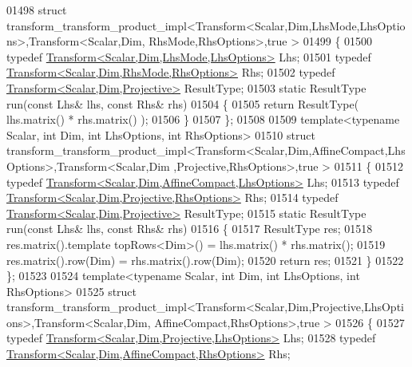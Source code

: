 \begin{DoxyCode}
01498 \textcolor{keyword}{struct }transform\_transform\_product\_impl<Transform<Scalar,Dim,LhsMode,LhsOptions>,Transform<Scalar,Dim,
      RhsMode,RhsOptions>,true >
01499 \{
01500   \textcolor{keyword}{typedef} \hyperlink{group___geometry___module_class_eigen_1_1_transform}{Transform<Scalar,Dim,LhsMode,LhsOptions>} Lhs;
01501   \textcolor{keyword}{typedef} \hyperlink{group___geometry___module_class_eigen_1_1_transform}{Transform<Scalar,Dim,RhsMode,RhsOptions>} Rhs;
01502   \textcolor{keyword}{typedef} \hyperlink{group___geometry___module_class_eigen_1_1_transform}{Transform<Scalar,Dim,Projective>} ResultType;
01503   \textcolor{keyword}{static} ResultType run(\textcolor{keyword}{const} Lhs& lhs, \textcolor{keyword}{const} Rhs& rhs)
01504   \{
01505     \textcolor{keywordflow}{return} ResultType( lhs.matrix() * rhs.matrix() );
01506   \}
01507 \};
01508 
01509 \textcolor{keyword}{template}<\textcolor{keyword}{typename} Scalar, \textcolor{keywordtype}{int} Dim, \textcolor{keywordtype}{int} LhsOptions, \textcolor{keywordtype}{int} RhsOptions>
01510 \textcolor{keyword}{struct }transform\_transform\_product\_impl<Transform<Scalar,Dim,AffineCompact,LhsOptions>,Transform<Scalar,Dim
      ,Projective,RhsOptions>,true >
01511 \{
01512   \textcolor{keyword}{typedef} \hyperlink{group___geometry___module_class_eigen_1_1_transform}{Transform<Scalar,Dim,AffineCompact,LhsOptions>} Lhs;
01513   \textcolor{keyword}{typedef} \hyperlink{group___geometry___module_class_eigen_1_1_transform}{Transform<Scalar,Dim,Projective,RhsOptions>} Rhs;
01514   \textcolor{keyword}{typedef} \hyperlink{group___geometry___module_class_eigen_1_1_transform}{Transform<Scalar,Dim,Projective>} ResultType;
01515   \textcolor{keyword}{static} ResultType run(\textcolor{keyword}{const} Lhs& lhs, \textcolor{keyword}{const} Rhs& rhs)
01516   \{
01517     ResultType res;
01518     res.matrix().template topRows<Dim>() = lhs.matrix() * rhs.matrix();
01519     res.matrix().row(Dim) = rhs.matrix().row(Dim);
01520     \textcolor{keywordflow}{return} res;
01521   \}
01522 \};
01523 
01524 \textcolor{keyword}{template}<\textcolor{keyword}{typename} Scalar, \textcolor{keywordtype}{int} Dim, \textcolor{keywordtype}{int} LhsOptions, \textcolor{keywordtype}{int} RhsOptions>
01525 \textcolor{keyword}{struct }transform\_transform\_product\_impl<Transform<Scalar,Dim,Projective,LhsOptions>,Transform<Scalar,Dim,
      AffineCompact,RhsOptions>,true >
01526 \{
01527   \textcolor{keyword}{typedef} \hyperlink{group___geometry___module_class_eigen_1_1_transform}{Transform<Scalar,Dim,Projective,LhsOptions>} Lhs;
01528   \textcolor{keyword}{typedef} \hyperlink{group___geometry___module_class_eigen_1_1_transform}{Transform<Scalar,Dim,AffineCompact,RhsOptions>} Rhs;

\end{DoxyCode}
